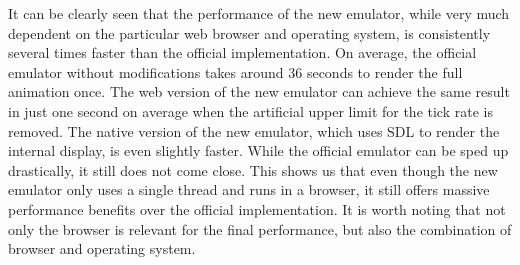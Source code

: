 It can be clearly seen that the performance of the new emulator, while very much dependent on the particular web browser and operating system, is consistently several times faster than the official implementation.
On average, the official emulator without modifications takes around 36 seconds to render the full animation once.
The web version of the new emulator can achieve the same result in just one second on average when the artificial upper limit for the tick rate is removed.
The native version of the new emulator, which uses SDL to render the internal display, is even slightly faster.
While the official emulator can be sped up drastically, it still does not come close.
This shows us that even though the new emulator only uses a single thread and runs in a browser, it still offers massive performance benefits over the official implementation.
It is worth noting that not only the browser is relevant for the final performance, but also the combination of browser and operating system.
